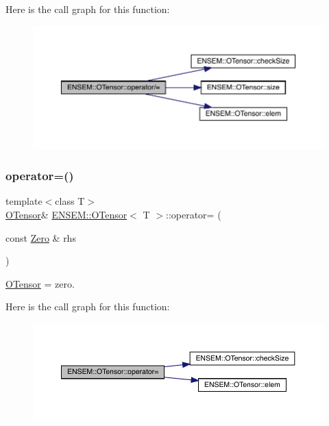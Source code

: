 Here is the call graph for this function\+:
\nopagebreak
\begin{figure}[H]
\begin{center}
\leavevmode
\includegraphics[width=350pt]{da/d8a/classENSEM_1_1OTensor_af8fb32358b6c05989221297a9b33096c_cgraph}
\end{center}
\end{figure}
\mbox{\label{classENSEM_1_1OTensor_aae562552ce915d3d39c65dfe463fa50a}} 
\subsubsection{\texorpdfstring{operator=()}{operator=()}\hspace{0.1cm}{\footnotesize\ttfamily [1/12]}}
{\footnotesize\ttfamily template$<$class T$>$ \\
\mbox{\hyperlink{classENSEM_1_1OTensor}{O\+Tensor}}\& \mbox{\hyperlink{classENSEM_1_1OTensor}{E\+N\+S\+E\+M\+::\+O\+Tensor}}$<$ T $>$\+::operator= (\begin{DoxyParamCaption}\item[{const \mbox{\hyperlink{structENSEM_1_1Zero}{Zero}} \&}]{rhs }\end{DoxyParamCaption})\hspace{0.3cm}{\ttfamily [inline]}}



\mbox{\hyperlink{classENSEM_1_1OTensor}{O\+Tensor}} = zero. 

Here is the call graph for this function\+:
\nopagebreak
\begin{figure}[H]
\begin{center}
\leavevmode
\includegraphics[width=350pt]{da/d8a/classENSEM_1_1OTensor_aae562552ce915d3d39c65dfe463fa50a_cgraph}
\end{center}
\end{figure}
\mbox{\label{classENSEM_1_1OTensor_aae562552ce915d3d39c65dfe463fa50a}} 
